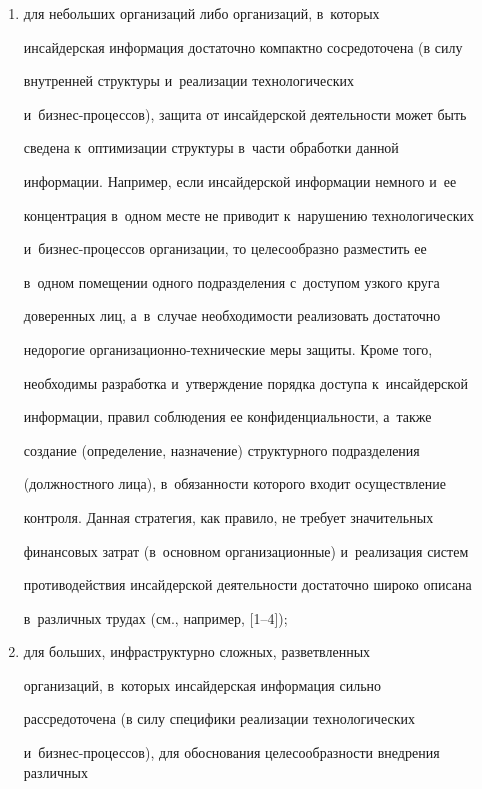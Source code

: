      \begin{enumerate}[(1)]


\item для небольших организаций либо организаций, в~которых 


инсайдерская информация достаточно компактно сосредоточена (в силу 


внутренней структуры и~реализации технологических  


и~бизнес-процессов), защита от инсайдерской деятельности может быть 


сведена к~оптимизации структуры в~части обработки данной 


информации. Например, если инсайдерской информации немного и~ее 


концентрация в~одном месте не приводит к~нарушению технологических  


и~бизнес-процессов организации, то целесообразно разместить ее 


в~одном помещении одного подразделения с~доступом узкого круга 


доверенных лиц, а~в~случае необходимости реализовать достаточно 


недорогие ор\-га\-ни\-за\-ци\-он\-но-технические меры защиты. Кроме того, 


необходимы разработка и~утверждение порядка доступа к~инсайдерской 


информации, правил соблюдения ее конфиденциальности, а~также 


создание (определение, назначение) структурного подразделения 


(должностного лица), в~обязанности которого входит осуществление 


контроля. Данная стратегия, как правило, не требует значительных 


финансовых затрат (в~основном организационные) и~реализация систем 


противодействия инсайдерской деятельности достаточно широко описана 


в~различных трудах (см., например, [1--4]);\\[-14pt]


\item для больших, инфраструктурно сложных, разветвленных 


организаций, в~которых инсайдерская информация сильно 


рассредоточена (в силу специфики реализации технологических 


и~бизнес-процессов), для обоснования целесообразности внедрения различных 



\end{enumerate}
